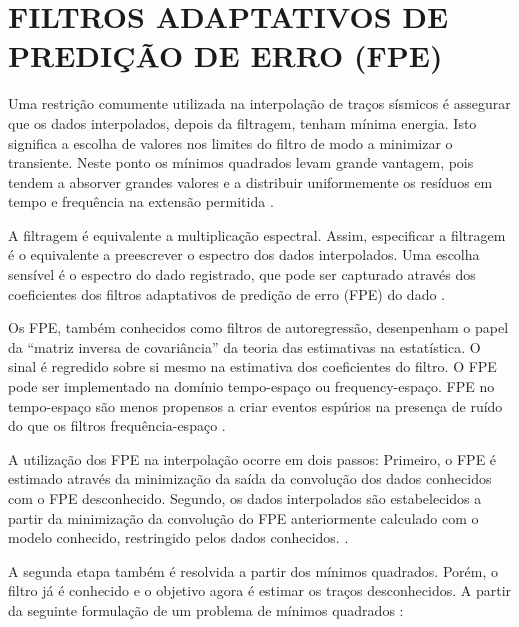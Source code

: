 %
% 
% 
% 
% 
% 
% 

\chapter{FILTROS ADAPTATIVOS DE PREDIÇÃO DE ERRO (FPE)}

Uma restrição comumente utilizada na interpolação de traços sísmicos
é assegurar que os dados interpolados, depois da filtragem,
tenham mínima energia. Isto significa a escolha de valores
nos limites do filtro de modo a minimizar o transiente. Neste ponto os mínimos
quadrados levam grande vantagem, pois tendem a absorver grandes valores e a distribuir
uniformemente os resíduos em tempo e frequência na extensão permitida \cite{claerbout92}.

A filtragem é equivalente a multiplicação espectral. Assim, especificar a filtragem
é o equivalente a preescrever o espectro dos dados interpolados. Uma escolha sensível
é o espectro do dado registrado, que pode ser capturado através dos coeficientes dos
filtros adaptativos de predição de erro (FPE) do dado \cite{spitz}. 

Os FPE, também conhecidos como filtros de autoregressão, desenpenham o
papel da ``matriz inversa de covariância'' da teoria das estimativas na estatística.
O sinal é regredido sobre si mesmo na estimativa dos coeficientes do filtro. O FPE
pode ser implementado na domínio tempo-espaço ou frequency-espaço. FPE no tempo-espaço
são menos propensos a criar eventos espúrios na presença de ruído do que os filtros
frequência-espaço \cite{abma}. 

A utilização dos FPE na interpolação ocorre em dois passos:
Primeiro, o FPE é estimado através da minimização da saída da convolução
dos dados conhecidos com o FPE desconhecido. Segundo, os dados interpolados
são estabelecidos a partir da minimização da convolução do FPE anteriormente 
calculado com o modelo conhecido, restringido pelos dados conhecidos. \cite{curry}.

A segunda etapa também é resolvida a partir dos mínimos quadrados. Porém,
o filtro já é conhecido e o objetivo agora é estimar os traços desconhecidos.
A partir da seguinte formulação de um problema de mínimos quadrados \cite{liu11}:


